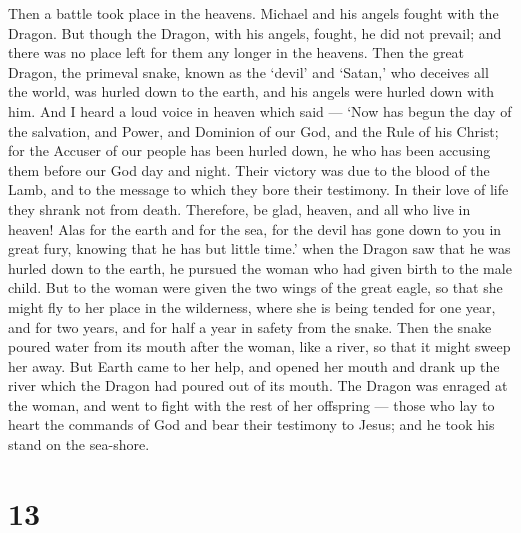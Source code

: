  Then a battle took place in the heavens. Michael and his
angels fought with the Dragon. But though the Dragon, with his angels,
fought,  he did not prevail; and there was no place left for
them any longer in the heavens.  Then the great Dragon, the
primeval snake, known as the `devil' and `Satan,' who deceives all the
world, was hurled down to the earth, and his angels were hurled down
with him.  And I heard a loud voice in heaven which said
--- `Now has begun the day of the salvation, and Power, and Dominion of
our God, and the Rule of his Christ; for the Accuser of our people has
been hurled down, he who has been accusing them before our God day and
night.  Their victory was due to the blood of the Lamb, and
to the message to which they bore their testimony. In their love of life
they shrank not from death.  Therefore, be glad, heaven,
and all who live in heaven! Alas for the earth and for the sea, for the
devil has gone down to you in great fury, knowing that he has but little
time.'  when the Dragon saw that he was hurled down to the
earth, he pursued the woman who had given birth to the male child.
 But to the woman were given the two wings of the great
eagle, so that she might fly to her place in the wilderness, where she
is being tended for one year, and for two years, and for half a year in
safety from the snake.  Then the snake poured water from
its mouth after the woman, like a river, so that it might sweep her
away.  But Earth came to her help, and opened her mouth and
drank up the river which the Dragon had poured out of its mouth.
 The Dragon was enraged at the woman, and went to fight
with the rest of her offspring --- those who lay to heart the commands
of God and bear their testimony to Jesus;  and he took his
stand on the sea-shore.

\hypertarget{section-12}{%
\section{13}\label{section-12}}

